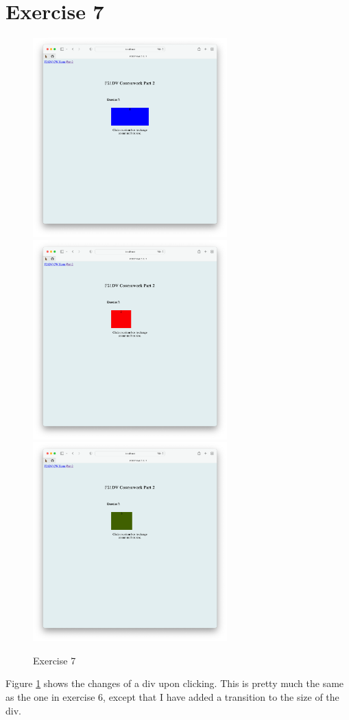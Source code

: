 \documentclass{scrreprt}
\begin{document}
\newpage
\section{Exercise 7}
\begin{figure}[!ht]
    \centering
    \includegraphics[width = 7.5cm]{images/ex7_1.png}
    \includegraphics[width = 7.5cm]{images/ex7_2.png}
    \includegraphics[width = 7.5cm]{images/ex7_3.png}
    \label{fig:ex7}
    \caption{Exercise 7}
\end{figure}
\FloatBarrier
% 
Figure \ref{fig:ex7} shows the changes of a div upon clicking. This is pretty much the same as the one in exercise 6, except that I have added a transition to the size of the div.
\end{document}
